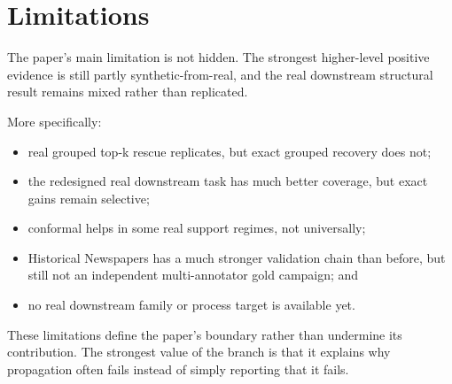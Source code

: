 \section{Limitations}

The paper's main limitation is not hidden. The strongest higher-level positive evidence is still partly synthetic-from-real, and the real downstream structural result remains mixed rather than replicated.

More specifically:

\begin{itemize}
\item real grouped top-k rescue replicates, but exact grouped recovery does not;
\item the redesigned real downstream task has much better coverage, but exact gains remain selective;
\item conformal helps in some real support regimes, not universally;
\item Historical Newspapers has a much stronger validation chain than before, but still not an independent multi-annotator gold campaign; and
\item no real downstream family or process target is available yet.
\end{itemize}

These limitations define the paper's boundary rather than undermine its contribution. The strongest value of the branch is that it explains why propagation often fails instead of simply reporting that it fails.
